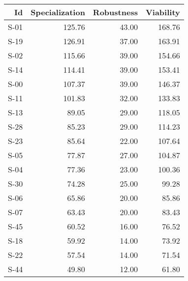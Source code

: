 \begin{tabular}{ | r | r | r | r | }
    \hline
                    Id  &  Specialization  &      Robustness  &       Viability  \\
    \hline
    \hline
                  S-01  &          125.76  &           43.00  &          168.76  \\
    \hline
                  S-19  &          126.91  &           37.00  &          163.91  \\
    \hline
                  S-02  &          115.66  &           39.00  &          154.66  \\
    \hline
                  S-14  &          114.41  &           39.00  &          153.41  \\
    \hline
                  S-00  &          107.37  &           39.00  &          146.37  \\
    \hline
                  S-11  &          101.83  &           32.00  &          133.83  \\
    \hline
                  S-13  &           89.05  &           29.00  &          118.05  \\
    \hline
                  S-28  &           85.23  &           29.00  &          114.23  \\
    \hline
                  S-23  &           85.64  &           22.00  &          107.64  \\
    \hline
                  S-05  &           77.87  &           27.00  &          104.87  \\
    \hline
                  S-04  &           77.36  &           23.00  &          100.36  \\
    \hline
                  S-30  &           74.28  &           25.00  &           99.28  \\
    \hline
                  S-06  &           65.86  &           20.00  &           85.86  \\
    \hline
                  S-07  &           63.43  &           20.00  &           83.43  \\
    \hline
                  S-45  &           60.52  &           16.00  &           76.52  \\
    \hline
                  S-18  &           59.92  &           14.00  &           73.92  \\
    \hline
                  S-22  &           57.54  &           14.00  &           71.54  \\
    \hline
                  S-44  &           49.80  &           12.00  &           61.80  \\

\end{tabular}
